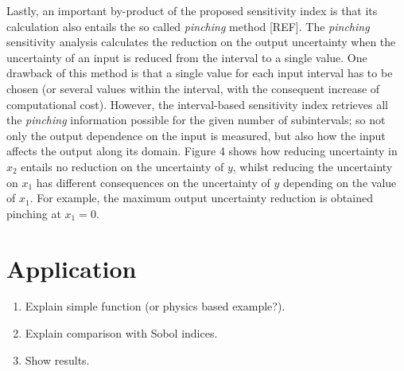 \documentclass[twocolumn]{rps-esrel2022}
\begin{document}
Lastly, an important by-product of the proposed sensitivity index is that its calculation also entails the so called \textit{pinching} method [REF].
The \textit{pinching} sensitivity analysis calculates the reduction on the output uncertainty when the uncertainty of an input is reduced from the interval to a single value.
One drawback of this method is that a single value for each input interval has to be chosen (or several values within the interval, with the consequent
increase of computational cost).
However, the interval-based sensitivity index retrieves all the \textit{pinching} information possible for the given number of subintervals; so not only the
output dependence on the input is measured, but also how the input affects the output along its domain.
Figure 4 shows how reducing uncertainty in $x_2$ entails no reduction on the uncertainty of $y$, whilst reducing the uncertainty on $x_1$ has different consequences on the
uncertainty of $y$ depending on the value of $x_1$.
For example, the maximum output uncertainty reduction is obtained pinching at $x_1 = 0$.



\section{Application}

\begin{enumerate}
	\item Explain simple function (or physics based example?).
	\item Explain comparison with Sobol indices.
	\item Show results.
\end{enumerate}
\end{document}
